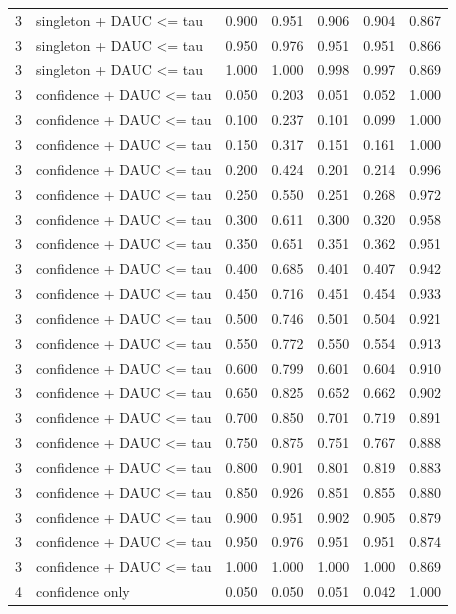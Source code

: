 \begin{tabular}{rlrrrrr}
3 & singleton + DAUC <= tau & 0.900 & 0.951 & 0.906 & 0.904 & 0.867 \\
3 & singleton + DAUC <= tau & 0.950 & 0.976 & 0.951 & 0.951 & 0.866 \\
3 & singleton + DAUC <= tau & 1.000 & 1.000 & 0.998 & 0.997 & 0.869 \\
3 & confidence + DAUC <= tau & 0.050 & 0.203 & 0.051 & 0.052 & 1.000 \\
3 & confidence + DAUC <= tau & 0.100 & 0.237 & 0.101 & 0.099 & 1.000 \\
3 & confidence + DAUC <= tau & 0.150 & 0.317 & 0.151 & 0.161 & 1.000 \\
3 & confidence + DAUC <= tau & 0.200 & 0.424 & 0.201 & 0.214 & 0.996 \\
3 & confidence + DAUC <= tau & 0.250 & 0.550 & 0.251 & 0.268 & 0.972 \\
3 & confidence + DAUC <= tau & 0.300 & 0.611 & 0.300 & 0.320 & 0.958 \\
3 & confidence + DAUC <= tau & 0.350 & 0.651 & 0.351 & 0.362 & 0.951 \\
3 & confidence + DAUC <= tau & 0.400 & 0.685 & 0.401 & 0.407 & 0.942 \\
3 & confidence + DAUC <= tau & 0.450 & 0.716 & 0.451 & 0.454 & 0.933 \\
3 & confidence + DAUC <= tau & 0.500 & 0.746 & 0.501 & 0.504 & 0.921 \\
3 & confidence + DAUC <= tau & 0.550 & 0.772 & 0.550 & 0.554 & 0.913 \\
3 & confidence + DAUC <= tau & 0.600 & 0.799 & 0.601 & 0.604 & 0.910 \\
3 & confidence + DAUC <= tau & 0.650 & 0.825 & 0.652 & 0.662 & 0.902 \\
3 & confidence + DAUC <= tau & 0.700 & 0.850 & 0.701 & 0.719 & 0.891 \\
3 & confidence + DAUC <= tau & 0.750 & 0.875 & 0.751 & 0.767 & 0.888 \\
3 & confidence + DAUC <= tau & 0.800 & 0.901 & 0.801 & 0.819 & 0.883 \\
3 & confidence + DAUC <= tau & 0.850 & 0.926 & 0.851 & 0.855 & 0.880 \\
3 & confidence + DAUC <= tau & 0.900 & 0.951 & 0.902 & 0.905 & 0.879 \\
3 & confidence + DAUC <= tau & 0.950 & 0.976 & 0.951 & 0.951 & 0.874 \\
3 & confidence + DAUC <= tau & 1.000 & 1.000 & 1.000 & 1.000 & 0.869 \\
4 & confidence only & 0.050 & 0.050 & 0.051 & 0.042 & 1.000 \\

\end{tabular}
